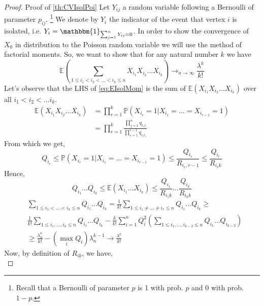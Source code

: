 \begin{proof}{Proof of \ref{th:CVIsolPoi}}
	Let $Y_{ij}$ a random variable following a Bernoulli of parameter $p_{ij}$.
	\footnote{ Recall that a Bernoulli of parameter $p$ is 1 with prob. $p$ and 0 with prob. $1-p$.}
	We denote by $Y_i$ the indicator of the event that vertex $i$ is isolated, i.e. $Y_i = \mathbbm{1}_{\sum_{j=1}^n Y_{ij} = 0}$.
	In order to show the convergence of $X_0$ in distribution to the Poisson random variable we will use the method of factorial moments.
	So, we want to show that for any natural number $k$ we have
	\begin{equation}\label{eq:EIsolMom}
		\mathbb{E}(\sum_{1\leq i_1<i_2< \ldots < i_k \leq n} X_{i_1}X_{i_2}\ldots X_{i_k}) \to_{n \to \infty} \frac{\lambda^k}{k!}
	\end{equation}
	Let's observe that the LHS of \eqref{eq:EIsolMom} is the sum of $\mathbb{E}(X_{i_1}X_{i_2}\ldots X_{i_k})$ over all $i_1 < i_2 < \ldots i_k$.
	\begin{align}
		\mathbb{E}(X_{i_1}X_{i_2}\ldots X_{i_k}) 	&= \prod_{r=1}^k \mathbb{P}(X_{i_r} = 1 | X_{i_1} = \ldots = X_{i_{r-1}} = 1) \\
							&= \prod_{r=1}^k\frac{ \prod_{j=1}^n q_{i_r j} }{ \prod_{s=1}^{r-1}q_{i_r i_s}}
	\end{align}
	From which we get,
	\begin{equation}
		Q_{i_r} \leq \mathbb{P}(X_{i_r} = 1 | X_{i_1} = \ldots = X_{i_{r-1}} = 1) \leq \frac{Q_{i_r}}{R_{i_r, r-1}} \leq \frac{Q_{i_r}}{R_{i_r k}} 
	\end{equation}
	Hence,
	\begin{equation}
		Q_{i_1} \ldots Q_{i_k} \leq \mathbb{E}(X_{i_1}\ldots X_{i_k}) \leq \frac{Q_{i_1}}{R_{i_1 k}} \ldots \frac{Q_{i_k}}{R_{i_k k}}
	\end{equation}
 	\begin{align}\label{eq:CVDOWN}
		&\sum_{1\leq i_1 < \ldots < i_k \leq n} Q_{i_1} \ldots Q_{i_k} = \frac{1}{k!}\sum_{1 \leq i_1 \neq \ldots \neq i_r \leq n} Q_{i_1} \ldots Q_{i_k} \geq\\
	     & \frac{1}{k!} \sum_{1\leq i_1, \ldots, i_k \leq n} Q_{i_1}\ldots Q_{i_k} 
		- \frac{k}{k!}\sum_{i=1}^n Q_i^2(\sum_{1 \leq i_1, \ldots, i_{k-2} \leq n} Q_{i_1} \ldots Q_{i_{k-2}})\\
		&\geq \frac{\lambda_n^k}{k!} - (\max_i Q_i)\lambda_n^{k-1} \longrightarrow \frac{\lambda^k}{k!}
 	\end{align}
 	Now, by definition of $R_{ik}$, we have,
 	\begin{equation}

\end{equation}
\end{proof}
